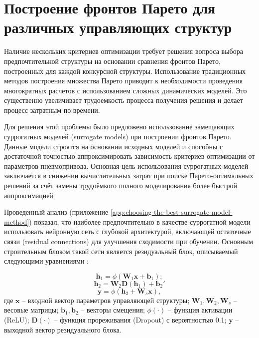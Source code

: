 \section{Построение фронтов Парето для различных управляющих структур}

Наличие нескольких критериев оптимизации требует решения вопроса выбора
предпочтительной структуры на основании сравнения фронтов Парето, построенных
для каждой конкурсной структуры. Использование традиционных методов построения
множества Парето приводит к необходимости проведения многократных расчетов с
использованием сложных динамических моделей. Это существенно увеличивает трудоемкость
процесса получения решения и делает процесс затратным по времени.

Для решения этой проблемы было предложено использование замещающих суррогатных
моделей (surrogate models) \cite{surrogate_model} при построении фронтов Парето.
Данные модели строятся на основании исходных моделей и способны с достаточной
точностью аппроксимировать зависимость критериев оптимизации от параметров
пневмопривода. Основная цель использования суррогатных
моделей заключается в снижении вычислительных затрат при поиске Парето-оптимальных
решений за счёт замены трудоёмкого полного моделирования более быстрой аппроксимацией

Проведенный анализ (приложение \ref{app:choosing-the-best-surrogate-model-method}) показал,
что наиболее предпочтительно в качестве суррогатной модели использовать нейронную сеть с
глубокой архитектурой, включающей остаточные связи (residual connections)
для улучшения сходимости при обучении. Основным строительным
блоком такой сети является резидуальный блок, описываемый следующими уравнениями \cite{he2015deepresiduallearningimage}:

\begin{equation}
	\mathbf{h}_1 = \phi(\mathbf{W}_1 \mathbf{x} + \mathbf{b}_1);
\end{equation}
\begin{equation}
	\mathbf{h}_2 = \mathbf{W}_2 \mathbf{D}(\mathbf{h}_1) + \mathbf{b}_2'
\end{equation}
\begin{equation}
	\mathbf{y} = \phi(\mathbf{h}_2 + \mathbf{W}_s \mathbf{x}),
\end{equation}
где $\mathbf{x}$ -- входной вектор параметров управляющей структуры;
$\mathbf{W}_1, \mathbf{W}_2, \mathbf{W}_s$ -- весовые матрицы;
$\mathbf{b}_1, \mathbf{b}_2$ -- векторы смещения;
$\phi(\cdot)$ -- функция активации (ReLU);
$\mathbf{D}(\cdot)$ -- функция прореживания (Dropout) с вероятностью \num{0.1};
$\mathbf{y}$ -- выходной вектор резидуального блока.


